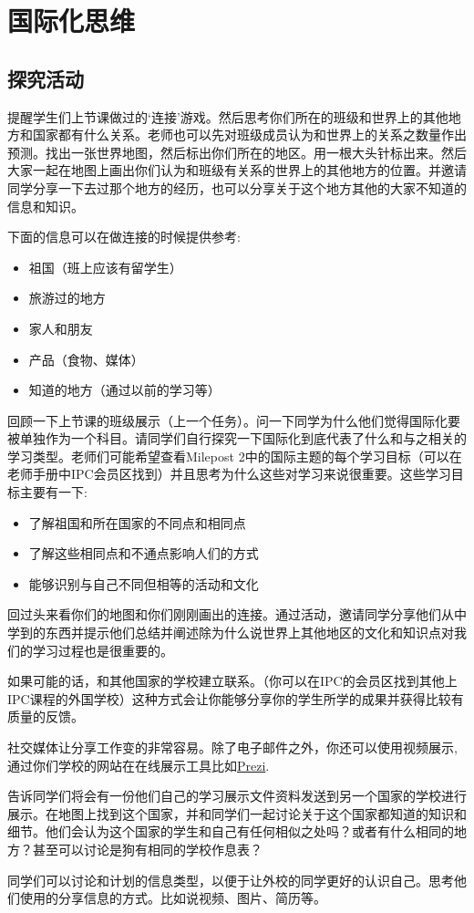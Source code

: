 \chapter{国际化思维}
    

\section{探究活动}
    提醒学生们上节课做过的‘连接’游戏。然后思考你们所在的班级和世界上的其他地方和国家都有什么关系。老师也可以先对班级成员认为和世界上的关系之数量作出预测。找出一张世界地图，然后标出你们所在的地区。用一根大头针标出来。然后大家一起在地图上画出你们认为和班级有关系的世界上的其他地方的位置。并邀请同学分享一下去过那个地方的经历，也可以分享关于这个地方其他的大家不知道的信息和知识。\par
    下面的信息可以在做连接的时候提供参考:\par
    \begin{itemize}
      \item 祖国（班上应该有留学生）
      \item 旅游过的地方
      \item 家人和朋友 
      \item 产品（食物、媒体）
      \item 知道的地方（通过以前的学习等）  
    \end{itemize}  
    回顾一下上节课的班级展示（上一个任务）。问一下同学为什么他们觉得国际化要被单独作为一个科目。请同学们自行探究一下国际化到底代表了什么和与之相关的学习类型。老师们可能希望查看Milepost 2中的国际主题的每个学习目标（可以在老师手册中IPC会员区找到）并且思考为什么这些对学习来说很重要。这些学习目标主要有一下:\par
    \begin{itemize}
      \item  了解祖国和所在国家的不同点和相同点
      \item  了解这些相同点和不通点影响人们的方式 
      \item  能够识别与自己不同但相等的活动和文化
\end{itemize}  
    回过头来看你们的地图和你们刚刚画出的连接。通过活动，邀请同学分享他们从中学到的东西并提示他们总结并阐述除为什么说世界上其他地区的文化和知识点对我们的学习过程也是很重要的。\par
    如果可能的话，和其他国家的学校建立联系。（你可以在IPC的会员区找到其他上IPC课程的外国学校）这种方式会让你能够分享你的学生所学的成果并获得比较有质量的反馈。\par
    社交媒体让分享工作变的非常容易。除了电子邮件之外，你还可以使用视频展示,通过你们学校的网站在在线展示工具比如\href{http://www.prezi.com/}{Prezi}.\par
    告诉同学们将会有一份他们自己的学习展示文件资料发送到另一个国家的学校进行展示。在地图上找到这个国家，并和同学们一起讨论关于这个国家都知道的知识和细节。他们会认为这个国家的学生和自己有任何相似之处吗？或者有什么相同的地方？甚至可以讨论是狗有相同的学校作息表？\par
    同学们可以讨论和计划的信息类型，以便于让外校的同学更好的认识自己。思考他们使用的分享信息的方式。比如说视频、图片、简历等。
\par

